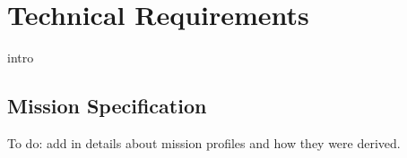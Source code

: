 \section{Technical Requirements}
intro 

% 

% 




\subsection{Mission Specification}

To do: add in details about mission profiles and how they were derived.


